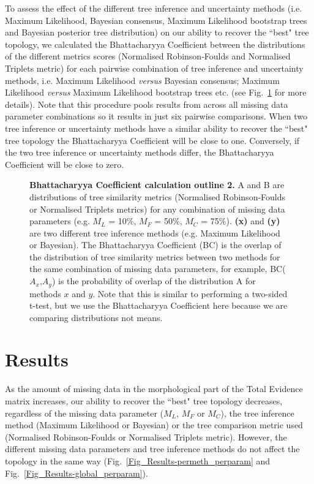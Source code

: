 \documentclass[10pt,letterpaper]{article}
\begin{document}
To assess the effect of the different tree inference and uncertainty methods (i.e. Maximum Likelihood, Bayesian consensus, Maximum Likelihood bootstrap trees and Bayesian posterior tree distribution) on our ability to recover the ``best" tree topology, we calculated the Bhattacharyya Coefficient between the distributions of the different metrics scores (Normalised Robinson-Foulds and Normalised Triplets metric) for each pairwise combination of tree inference and uncertainty methods, i.e. Maximum Likelihood \textit{versus} Bayesian consensus; Maximum Likelihood \textit{versus} Maximum Likelihood bootstrap trees etc. (see Fig.~\ref{Fig_Bhattacharyya_Coefficients2} for more details). Note that this procedure pools results from across all missing data parameter combinations so it results in just six pairwise comparisons. When two tree inference or uncertainty methods have a similar ability to recover the ``best" tree topology the Bhattacharyya Coefficient will be close to one. Conversely, if the two tree inference or uncertainty methods differ, the Bhattacharyya Coefficient will be close to zero.

\begin{figure}[h]
\caption{{\bf Bhattacharyya Coefficient calculation outline 2.}
 A and B are distributions of tree similarity metrics (Normalised Robinson-Foulds or Normalised Triplets metrics) for any combination of missing data parameters (e.g. $M_{L}$ = 10\%, $M_{F}$ = 50\%, $M_{C}$ = 75\%). \textbf{(x)} and \textbf{(y)} are two different tree inference methods (e.g. Maximum Likelihood or Bayesian). The Bhattacharyya Coefficient (BC) is the overlap of the distribution of tree similarity metrics between two methods for the same combination of missing data parameters, for example, BC($A_{x}$,$A_{y}$) is the probability of overlap of the distribution A for methods $x$ and $y$. Note that this is similar to performing a two-sided t-test, but we use the Bhattacharyya Coefficient here because we are comparing distributions not means.}
\label{Fig_Bhattacharyya_Coefficients2} 
\end{figure}

%
%

\section*{Results}
As the amount of missing data in the morphological part of the Total Evidence matrix increases, our ability to recover the ``best" tree topology decreases, regardless of the missing data parameter ($M_{L}$, $M_{F}$ or $M_{C}$), the tree inference method (Maximum Likelihood or Bayesian) or the tree comparison metric used (Normalised Robinson-Foulds or Normalised Triplets metric). However, the different missing data parameters and tree inference methods do not affect the topology in the same way (Fig.~\ref{Fig_Results-permeth_perparam} and Fig.~\ref{Fig_Results-global_perparam}).
\end{document}
